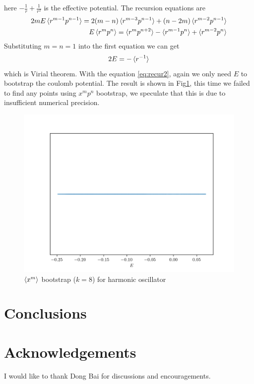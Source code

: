 \documentclass[aps,prl, preprint,amsmath, amssymb]{revtex4-2}
\begin{document}
here $- \frac1r + \frac1{r^2}$ is the effective potential. The recursion equations are 
\begin{align}
    2mE\braket{r^{m - 1} p^{n - 1}} = 2(m - n)\braket{r^{m - 3} p^{n - 1}} + (n - 2m)\braket{r^{m - 2} p^{n - 1}} \notag \\ 
    E\braket{r^m p^n} = \braket{r^m p^{n + 2}} - \braket{r^{m - 1} p^n} + \braket{r^{m - 2} p^n}
\end{align}
Substituting $m = n = 1$ into the first equation we can get
\begin{equation}
    2E = -\braket{r^{-1}}
\end{equation}
which is Virial theorem. With the equation \eqref{eq:recur2}, again we only need $E$ to bootstrap the coulomb potential. The result is shown in Fig\ref{fig:coulomb}, this time we failed to find any points using $x^m p^n$ bootstrap, we speculate that this is due to insufficient numerical precision.
\begin{figure}
    \includegraphics[width=0.8\linewidth]{coulomb.png}
    \caption{$\braket{x^m}$ bootstrap ($k = 8$) for harmonic oscillator}
    \label{fig:coulomb}
\end{figure}
\section{Conclusions}

\section*{Acknowledgements}
I would like to thank Dong Bai for discussions and encouragements.


\end{document}
